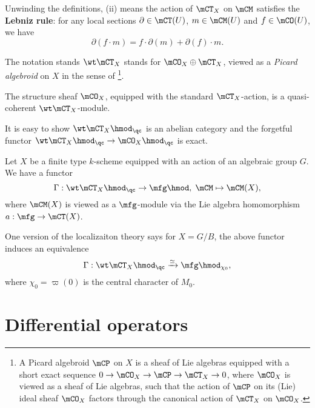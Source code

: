 	\begin{rem}
		Unwinding the definitions, (ii) means the action of $\mCT_X$ on $\mCM$ satisfies the \textbf{Lebniz rule}: for any local sections $\partial\in \mCT(U)$, $m\in \mCM(U)$ and $f\in \mCO(U)$, we have
		\[
			\partial( f\cdot m ) = f\cdot \partial(m)+\partial(f)\cdot m.
		\]
	\end{rem}

	\begin{rem}
		The notation stands $\wt\mCT_X$ stands for $\mCO_X \oplus \mCT_X$, viewed as a \emph{Picard algebroid} on $X$ in the sense of \cite{BB}\footnote{A Picard algebroid $\mCP$ on $X$ is a sheaf of Lie algebras equipped with a short exact sequence $0 \to \mCO_X \to \mCP \to \mCT_X \to 0$, where $\mCO_X$ is viewed as a sheaf of Lie algebras, such that the action of $\mCP$ on its (Lie) ideal sheaf $\mCO_X$ factors through the canonical action of $\mCT_X$ on $\mCO_X$.}. 
	\end{rem}

	\begin{exam}
		The structure sheaf $\mCO_X$, equipped with the standard $\mCT_X$-action, is a quasi-coherent $\wt\mCT_X$-module.
	\end{exam}

	\begin{rem}
		It is easy to show $\wt\mCT_X\hmod_\qc$ is an abelian category and the forgetful functor $\wt\mCT_X\hmod_\qc \to \mCO_X\hmod_\qc$ is exact.
	\end{rem}


	\begin{constr}
		Let $X$ be a finite type $k$-scheme equipped with an action of an algebraic group $G$. We have a functor
		\[
			\Gamma: \wt\mCT_X\hmod_\qc \to \mfg\hmod,\; \mCM \mapsto \mCM(X),
		\]
		where $\mCM(X)$ is viewed as a $\mfg$-module via the Lie algebra homomorphism $a:\mfg \to \mCT(X)$.
	\end{constr}

	\begin{rem}
		One version of the localizaiton theory says for $X=G/B$, the above functor induces an equivalence
		\[
			\Gamma: \wt\mCT_X\hmod_\qc \xrightarrow{\simeq} \mfg\hmod_{\chi_0},
		\]
		where $\chi_0=\varpi(0)$ is the central character of $M_0$.
	\end{rem}

\section{Differential operators}

